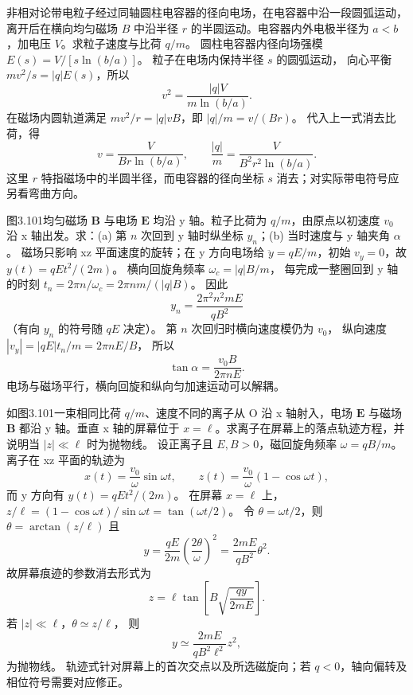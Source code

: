 非相对论带电粒子经过同轴圆柱电容器的径向电场，在电容器中沿一段圆弧运动，离开后在横向均匀磁场 $B$ 中沿半径 $r$ 的半圆运动。电容器内外电极半径为 $a<b$，加电压 $V$。求粒子速度与比荷 $q/m$。
\exsolution
圆柱电容器内径向场强模
$E(s)=V/[s\ln(b/a)]$。
粒子在电场内保持半径 $s$ 的圆弧运动，
向心平衡
$mv^2/s=|q|E(s)$，所以
\[
v^2=\frac{|q|V}{m\ln(b/a)}.
\]
在磁场内圆轨道满足
$mv^2/r=|q|vB$，即
$|q|/m=v/(Br)$。
代入上一式消去比荷，得
\[
\boxed{v=\frac{V}{Br\ln(b/a)}},
\qquad
\boxed{\frac{|q|}{m}=
\frac{V}{B^2r^2\ln(b/a)}}.
\]
\excheck 这里 $r$ 特指磁场中的半圆半径，而电容器的径向坐标 $s$ 消去；对实际带电符号应另看弯曲方向。

图3.101均匀磁场 $\bm B$ 与电场 $\bm E$ 均沿 y 轴。粒子比荷为 $q/m$，由原点以初速度 $v_0$ 沿 x 轴出发。求：(a) 第 $n$ 次回到 y 轴时纵坐标 $y_n$；(b) 当时速度与 y 轴夹角 $\alpha$。
\exsolution
磁场只影响 xz 平面速度的旋转；在 y 方向电场给
$\ddot y=qE/m$，初始 $v_y=0$，故
$y(t)=qEt^2/(2m)$。
横向回旋角频率
$\omega_c=|q|B/m$，
每完成一整圈回到 y 轴的时刻
$t_n=2\pi n/\omega_c=2\pi nm/(|q|B)$。
因此
\[
\boxed{y_n=\frac{2\pi^2n^2mE}{qB^2}}
\]
（有向 $y_n$ 的符号随 $qE$ 决定）。
第 $n$ 次回归时横向速度模仍为 $v_0$，
纵向速度
$|v_y|=|qE|t_n/m=2\pi nE/B$，
所以
\[
\boxed{\tan\alpha=\frac{v_0B}{2\pi nE}}.
\]
\excheck 电场与磁场平行，横向回旋和纵向匀加速运动可以解耦。

如图3.101一束相同比荷 $q/m$、速度不同的离子从 O 沿 x 轴射入，电场 $\bm E$ 与磁场 $\bm B$ 都沿 y 轴。垂直 x 轴的屏幕位于 $x=\ell$。求离子在屏幕上的落点轨迹方程，并说明当 $|z|\ll\ell$ 时为抛物线。
\exsolution
设正离子且 $E,B>0$，磁回旋角频率
$\omega=qB/m$。
离子在 xz 平面的轨迹为
\[
x(t)=\frac{v_0}{\omega}\sin\omega t,
\qquad
z(t)=\frac{v_0}{\omega}(1-\cos\omega t),
\]
而 y 方向有
$y(t)=qEt^2/(2m)$。
在屏幕 $x=\ell$ 上，
$z/\ell=(1-\cos\omega t)/\sin\omega t
=\tan(\omega t/2)$。
令 $\theta=\omega t/2$，则
$\theta=\arctan(z/\ell)$ 且
\[
y=\frac{qE}{2m}\left(\frac{2\theta}{\omega}\right)^2
=\frac{2mE}{qB^2}\theta^2.
\]
故屏幕痕迹的参数消去形式为
\[
\boxed{z=\ell\tan\left[
B\sqrt{\frac{qy}{2mE}}\right]}.
\]
若 $|z|\ll\ell$，$\theta\simeq z/\ell$，
则
\[
\boxed{y\simeq\frac{2mE}{qB^2\ell^2}z^2},
\]
为抛物线。
\excheck 轨迹式针对屏幕上的首次交点以及所选磁旋向；若 $q<0$，轴向偏转及相位符号需要对应修正。

